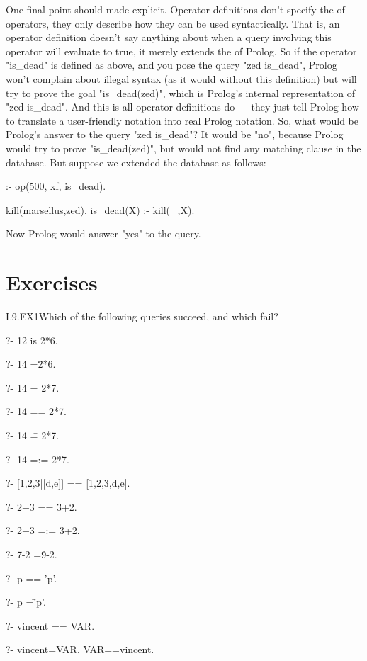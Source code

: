 One final point should made explicit. Operator definitions don't
specify the  of operators, they only describe how
they can be used syntactically. That is, an operator definition
doesn't say anything about when a query involving this operator will
evaluate to true, it merely extends the  of
Prolog. So if the operator "is\_dead" is defined as above, and you pose
the query "zed is\_dead", Prolog won't complain about illegal syntax
(as it would without this definition) but  will try to prove the
goal "is\_dead(zed)", which is Prolog's internal representation of
"zed is\_dead". And this is all operator definitions do --- they just tell
Prolog how to translate a user-friendly notation into real Prolog
notation. So, what would be Prolog's answer to the query
"zed is\_dead"? It would be "no", because Prolog would try to prove
"is\_dead(zed)", but would not find any matching clause in the
database.  But suppose we extended the database as follows:
\begin{LPNcodedisplay}
:- op(500, xf, is_dead).

kill(marsellus,zed).
is_dead(X) :- kill(_,X).
\end{LPNcodedisplay}
Now Prolog would answer "yes" to the query.


\section{Exercises}\label{SEC.L9.EXERCISES}

\begin{LPNexercise}{L9.EX1}Which of the following queries succeed, and which fail?
\begin{LPNcodedisplay}
?- 12 is 2*6.

?- 14 =\= 2*6.

?- 14 = 2*7.

?- 14 == 2*7.

?- 14 \== 2*7.

?- 14 =:= 2*7.

?- [1,2,3|[d,e]] == [1,2,3,d,e].

?- 2+3 == 3+2.

?- 2+3 =:= 3+2.

?- 7-2 =\= 9-2.

?- p == 'p'.

?- p =\= 'p'.

?- vincent == VAR.

?- vincent=VAR, VAR==vincent.

\end{LPNcodedisplay}
\end{LPNexercise}

